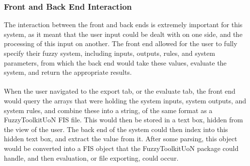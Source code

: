 \tocless\subsubsection{Front and Back End Interaction}
\noindent 
The interaction between the front and back ends is extremely important for this system, as it meant that the user input could be dealt with on one side, and the processing of this input on another. The front end allowed for the user to fully specify their fuzzy system, including inputs, outputs, rules, and system parameters, from which the back end would take these values, evaluate the system, and return the appropriate results.\ \\
\ \\
When the user navigated to the export tab, or the evaluate tab, the front end would query the arrays that were holding the system inputs, system outputs, and system rules, and combine these into a string, of the same format as a FuzzyToolkitUoN FIS file. This would then be stored in a text box, hidden from the view of the user. The back end of the system could then index into this hidden text box, and extract the value from it. After some parsing, this object would be converted into a FIS object that the FuzzyToolkitUoN package could handle, and then evaluation, or file exporting, could occur.

